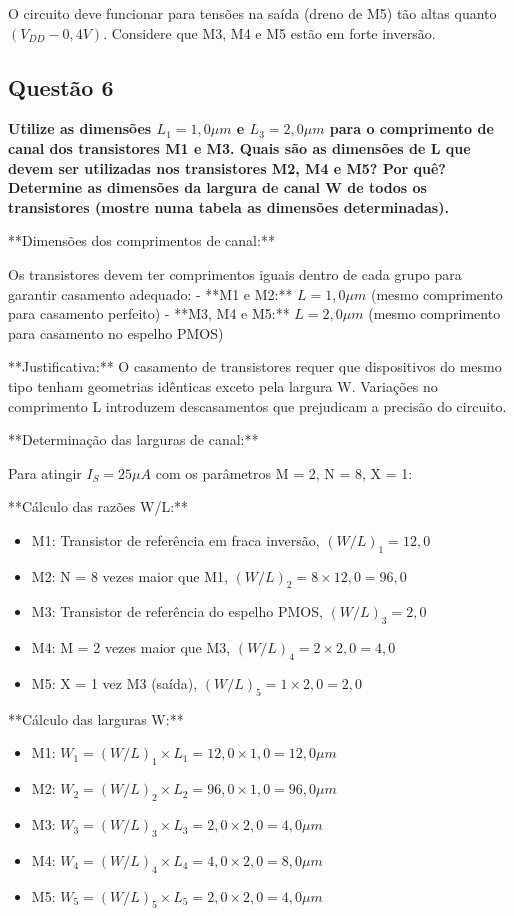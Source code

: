 \documentclass[12pt,a4paper]{article}
\begin{document}
O circuito deve funcionar para tensões na saída (dreno de M5) tão altas quanto $(V_{DD} - 0,4V)$. Considere que M3, M4 e M5 estão em forte inversão.

\subsection*{Questão 6}

\textbf{Utilize as dimensões $L_1 = 1,0 \mu m$ e $L_3 = 2,0 \mu m$ para o comprimento de canal dos transistores M1 e M3. Quais são as dimensões de L que devem ser utilizadas nos transistores M2, M4 e M5? Por quê? Determine as dimensões da largura de canal W de todos os transistores (mostre numa tabela as dimensões determinadas).} 

**Dimensões dos comprimentos de canal:**

Os transistores devem ter comprimentos iguais dentro de cada grupo para garantir casamento adequado:
- **M1 e M2:** $L = 1,0 \mu m$ (mesmo comprimento para casamento perfeito)
- **M3, M4 e M5:** $L = 2,0 \mu m$ (mesmo comprimento para casamento no espelho PMOS)

**Justificativa:** O casamento de transistores requer que dispositivos do mesmo tipo tenham geometrias idênticas exceto pela largura W. Variações no comprimento L introduzem descasamentos que prejudicam a precisão do circuito.

**Determinação das larguras de canal:**

Para atingir $I_S = 25 \mu A$ com os parâmetros M = 2, N = 8, X = 1:

**Cálculo das razões W/L:**
\begin{itemize}
    \item M1: Transistor de referência em fraca inversão, $(W/L)_1 = 12,0$
    \item M2: N = 8 vezes maior que M1, $(W/L)_2 = 8 \times 12,0 = 96,0$
    \item M3: Transistor de referência do espelho PMOS, $(W/L)_3 = 2,0$
    \item M4: M = 2 vezes maior que M3, $(W/L)_4 = 2 \times 2,0 = 4,0$
    \item M5: X = 1 vez M3 (saída), $(W/L)_5 = 1 \times 2,0 = 2,0$
\end{itemize}

**Cálculo das larguras W:**
\begin{itemize}
    \item M1: $W_1 = (W/L)_1 \times L_1 = 12,0 \times 1,0 = 12,0 \mu m$
    \item M2: $W_2 = (W/L)_2 \times L_2 = 96,0 \times 1,0 = 96,0 \mu m$
    \item M3: $W_3 = (W/L)_3 \times L_3 = 2,0 \times 2,0 = 4,0 \mu m$
    \item M4: $W_4 = (W/L)_4 \times L_4 = 4,0 \times 2,0 = 8,0 \mu m$
    \item M5: $W_5 = (W/L)_5 \times L_5 = 2,0 \times 2,0 = 4,0 \mu m$
\end{itemize}
\end{document}
